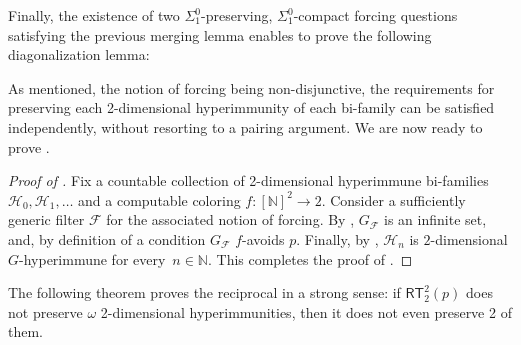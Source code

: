 \documentclass{article}
\def\PP{\mathbb{P}}
\def\F{\mathcal{F}}
\def\Hc{\mathcal{H}}
\newcommand{\RT}[0]{\mathsf{RT}}
\newcommand{\NN}[0]{\mathbb{N}}
\def\NN{\mathbb{N}}
\def\PP{\mathbb{P}}
\def\F{\mathcal{F}}
\def\Hc{\mathcal{H}}
\def\PP{\mathbb{P}}
\numberwithin{theorem}{section}
\newtheorem{lemma}[theorem]{Lemma}
\theoremstyle{definition}
\newtheorem{corollary}[theorem]{Corollary}
\begin{document}
Finally, the existence of two $\Sigma^0_1$-preserving, $\Sigma^0_1$-compact forcing questions satisfying the previous merging lemma enables to prove the following diagonalization lemma:



As mentioned, the notion of forcing being non-disjunctive, the requirements for preserving each 2-dimensional hyperimmunity of each bi-family can be satisfied independently, without resorting to a pairing argument.
We are now ready to prove .

\begin{proof}[Proof of ]
Fix a countable collection of 2-dimensional hyperimmune bi-families $\Hc_0, \Hc_1, \dots$ and a computable coloring $f : [\NN]^2 \to 2$.
Consider a sufficiently generic filter $\F$ for the associated notion of forcing. By ,  $G_\F$ is an infinite set, and, by definition of a condition $G_\F$ $f$-avoids $p$. Finally, by , $\Hc_n$ is $2$-dimensional $G$-hyperimmune for every~$n \in \NN$.
This completes the proof of .
\end{proof}






The following theorem proves the reciprocal in a strong sense: if $\RT^2_2(p)$ does not preserve $\omega$ 2-dimensional hyperimmunities, then it does not even preserve 2 of them.
\end{document}
